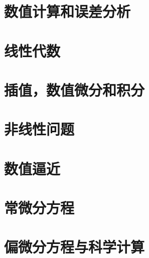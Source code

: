\chapter{数值计算和误差分析}



\chapter{线性代数}




\chapter{插值，数值微分和积分}



\chapter{非线性问题}



\chapter{数值逼近}



\chapter{常微分方程}


\chapter{偏微分方程与科学计算}










